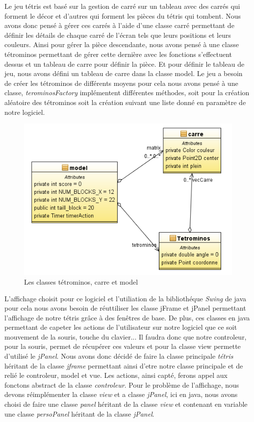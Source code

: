 \documentclass{article}           %
\begin{document}
Le jeu tétris est basé sur la gestion de carré sur un tableau avec des carrés qui forment le décor et d'autres qui forment les pièces du tétris qui tombent. Nous avons donc pensé à gérer ces carrés à l'aide d'une classe carré permettant de définir les détails de chaque carré de l’écran tels que leurs positions et leurs couleurs. Ainsi pour gérer la pièce descendante, nous avons pensé à une classe tétrominos permettant de gérer cette dernière avec les fonctions s’effectuent dessus et un tableau de carre pour définir la pièce. Et pour définir le tableau de jeu, nous avons défini un tableau de carre dans la classe model.
Le jeu a besoin de créer les tétrominos de différents moyens pour cela nous avons pensé à une classe, \emph{terominosFactory}  implémentent différentes méthodes, soit pour la création aléatoire des tétrominos soit la création suivant une liste donné en paramètre de notre logiciel.

\begin{figure}[h]
   \caption{Les classes tétrominos, carre et model }
   \includegraphics{diagram2.png}
\end{figure}

\newpage

L'affichage choisit pour ce logiciel et l'utiliation de la bibliothéque \emph{Swing} de java pour cela nous avons besoin de réuttiliser les classe jFrame et  jPanel permettant l'affichage de notre tétris grâce à des fenêtres de base. De plus, ces classes en java permettant de capeter les actions de l'utilisateur sur notre logiciel que ce soit mouvement de la souris, touche du clavier...
Il faudra donc que notre controleur, pour la souris, permet de récupérer ces valeurs et pour la classe view permette d'utilisé le \emph{jPanel}. Nous avons donc décidé de faire la classe principale \emph{tétris} héritant de la classe \emph{jframe} permettant ainsi d'etre notre classe principale et de relié le controleur, model et vue. Les actions, ainsi capté, ferons appel aux fonctons abstract de la classe \emph{controleur}. 
Pour le problème de l'affichage, nous devons réimplémenter la classe \emph{view} et a classe \emph{jPanel}, ici en java, nous avons choisi de faire une classe \emph{panel} héritant de la classe \emph{view}   et contenant en variable une classe \emph{persoPanel} héritant de la classe \emph{jPanel}.
\end{document}
